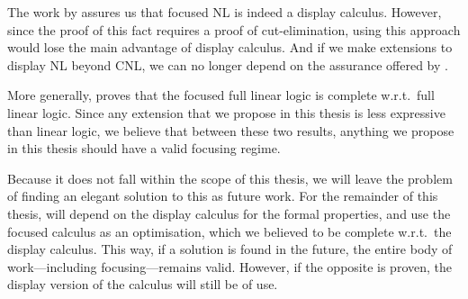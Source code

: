The work by \citeauthor{bastenhof2011} assures us that focused NL is
indeed a display calculus. However, since the proof of this fact
requires a proof of cut-elimination, using this approach would lose
the main advantage of display calculus. And if we make extensions to
display NL beyond CNL, we can no longer depend on the assurance
offered by \citeauthor{bastenhof2011}.

More generally, \citet{andreoli1992} proves that the focused full
linear logic is complete w.r.t.\ full linear logic. Since any
extension that we propose in this thesis is less expressive than
linear logic, we believe that between these two results, anything we
propose in this thesis should have a valid focusing regime.

Because it does not fall within the scope of this thesis, we will
leave the problem of finding an elegant solution to this as future
work. For the remainder of this thesis, will depend on the display
calculus for the formal properties, and use the focused calculus as an
optimisation, which we believed to be complete w.r.t.\ the display
calculus. This way, if a solution is found in the future, the entire
body of work---including focusing---remains valid. However, if the
opposite is proven, the display version of the calculus will still be
of use.
